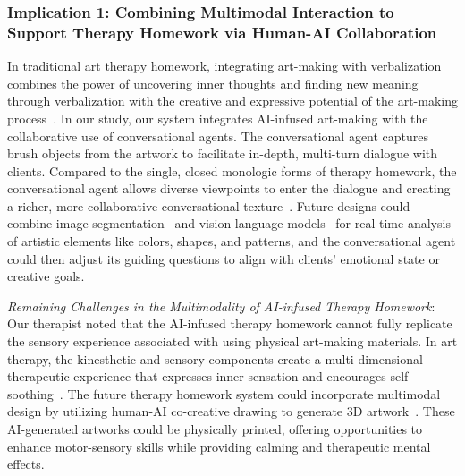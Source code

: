 %


\subsubsection{Implication 1: Combining Multimodal Interaction to Support Therapy Homework via Human-AI Collaboration}
In traditional art therapy homework, integrating art-making with verbalization combines the power of uncovering inner thoughts and finding new meaning through verbalization with the creative and expressive potential of the art-making process~\cite{hoshino2011narrative}.
In our study, our system integrates AI-infused art-making with the collaborative use of conversational agents. The conversational agent captures brush objects from the artwork to facilitate in-depth, multi-turn dialogue with clients. 
Compared to the single, closed monologic forms of therapy homework, the conversational agent allows diverse viewpoints to enter the dialogue and creating a richer, more collaborative conversational texture~\cite{pare2004willow}.
Future designs could combine image segmentation~\cite{kirillov2023segment} and vision-language models~\cite{zhang2024vision} for real-time analysis of artistic elements like colors, shapes, and patterns, and the conversational agent could then adjust its guiding questions to align with clients' emotional state or creative goals.

\textit{Remaining Challenges in the Multimodality of AI-infused Therapy Homework}: Our therapist noted that the AI-infused therapy homework cannot fully replicate the sensory experience associated with using physical art-making materials. 
In art therapy, the kinesthetic and sensory components create a multi-dimensional therapeutic experience that expresses inner sensation and encourages self-soothing~\cite{hinz2019expressive}.
The future therapy homework system could incorporate multimodal design by utilizing human-AI co-creative drawing to generate 3D artwork~\cite{liu2024he}. These AI-generated artworks could be physically printed, offering opportunities to enhance motor-sensory skills while providing calming and therapeutic mental effects.



